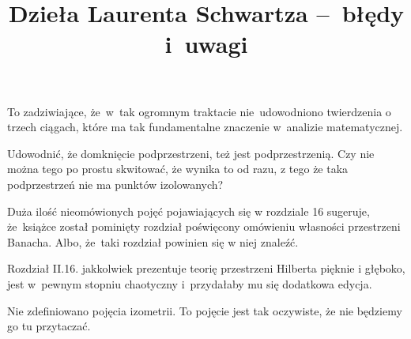 \documentclass[a4paper,11pt]{article}
\title{Dzieła Laurenta Schwartza --~błędy i~uwagi}
\begin{document}



\maketitle  %








\start To zadziwiające, że~w~tak ogromnym traktacie nie~udowodniono
twierdzenia o trzech ciągach, które ma tak fundamentalne znaczenie
w~analizie matematycznej.

\vspace{\spaceFour}

  
\start Udowodnić, że domknięcie podprzestrzeni, też jest
podprzestrzenią. Czy nie można tego po prostu skwitować, że wynika to
od razu, z tego że taka podprzestrzeń nie ma punktów izolowanych?

\vspace{\spaceFour}

\start Duża ilość nieomówionych pojęć pojawiających się w rozdziale 16
sugeruje, że~książce został pominięty rozdział poświęcony omówieniu
własności przestrzeni Banacha. Albo, że~taki rozdział powinien się w
niej znaleźć.

\vspace{\spaceFour}


\start Rozdział II.16. jakkolwiek prezentuje teorię przestrzeni
Hilberta pięknie i głęboko, jest w~pewnym stopniu chaotyczny
i~przydałaby mu się dodatkowa edycja.

\vspace{\spaceFour}

  
\start Nie zdefiniowano pojęcia izometrii. To pojęcie jest tak
oczywiste, że nie będziemy go tu przytaczać.

\vspace{\spaceTwo}

\noi {}
\end{document}

